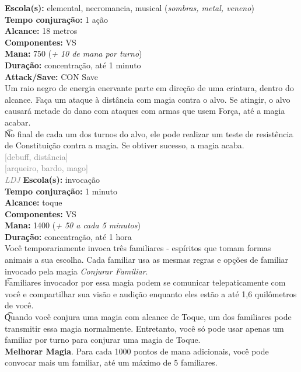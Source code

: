 \documentclass{RPG_Adventure}[2021/10/20]
\begin{document}
{\small \t \textbf{Escola(s):} elemental, necromancia, musical (\textit{sombras, metal, veneno})\\\t \textbf{Tempo conjuração:} 1 ação\\\t \textbf{Alcance:} 18 metros\\\t \textbf{Componentes:} VS\\\t \textbf{Mana:} 750 (\textit{+ 10 de mana por turno})\\\t \textbf{Duração:} concentração, até 1 minuto\\\t \textbf{Attack/Save:} CON Save\\}
{\normalsize Um raio negro de energia enervante parte em direção de uma criatura, dentro do alcance. Faça um ataque à distância com magia contra o alvo. Se atingir, o alvo causará metade do dano com ataques com armas que usem Força, até a magia acabar.\\\t No final de cada um dos turnos do alvo, ele pode realizar um teste de resistência de Constituição contra a magia. Se obtiver sucesso, a magia acaba.\\}
{\scriptsize \textcolor{gray}{[debuff, distância]\\}}
{\scriptsize \textcolor{gray}{[arqueiro, bardo, mago]\\}}
{\tiny \textcolor{gray}{\textit{LDJ}}}
{\small \t \textbf{Escola(s):} invocação\\\t \textbf{Tempo conjuração:} 1 minuto\\\t \textbf{Alcance:} toque\\\t \textbf{Componentes:} VS\\\t \textbf{Mana:} 1400 (\textit{+ 50 a cada 5 minutos})\\\t \textbf{Duração:} concentração, até 1 hora\\}
{\normalsize Você temporariamente invoca três familiares - espíritos que tomam formas animais a sua escolha. Cada familiar usa as mesmas regras e opções de familiar invocado pela magia \textit{Conjurar Familiar}.\\\t Familiares invocador por essa magia podem se comunicar telepaticamente com você e compartilhar sua visão e audição enquanto eles estão a até 1,6 quilômetros de você.\\\t Quando você conjura uma magia com alcance de Toque, um dos familiares pode transmitir essa magia normalmente. Entretanto, você só pode usar apenas um familiar por turno para conjurar uma magia de Toque.\\\t \textbf{Melhorar Magia}. Para cada 1000 pontos de mana adicionais, você pode convocar mais um familiar, até um máximo de 5 familiares.\\}
\end{document}
